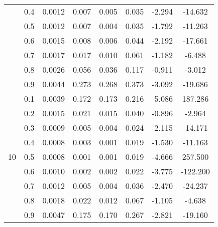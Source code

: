 \documentclass[11pt,a4paper]{report}
\begin{document}
\begin{longtable}{ | c | c || c | c | c | c | c | c | }
 & 0.4 & 0.0012 & 0.007 & 0.005 & 0.035 & -2.294 & -14.632 \\
 & 0.5 & 0.0012 & 0.007 & 0.004 & 0.035 & -1.792 & -11.263 \\
 & 0.6 & 0.0015 & 0.008 & 0.006 & 0.044 & -2.192 & -17.661 \\
 & 0.7 & 0.0017 & 0.017 & 0.010 & 0.061 & -1.182 & -6.488 \\
 & 0.8 & 0.0026 & 0.056 & 0.036 & 0.117 & -0.911 & -3.012 \\
 & 0.9 & 0.0044 & 0.273 & 0.268 & 0.373 & -3.092 & -19.686 \\
 \hline
\multirow{9}{*}{10} & 0.1 & 0.0039 & 0.172 & 0.173 & 0.216 & -5.086 & 187.286 \\
 & 0.2 & 0.0015 & 0.021 & 0.015 & 0.040 & -0.896 & -2.964 \\
 & 0.3 & 0.0009 & 0.005 & 0.004 & 0.024 & -2.115 & -14.171 \\
 & 0.4 & 0.0008 & 0.003 & 0.001 & 0.019 & -1.530 & -11.163 \\
 & 0.5 & 0.0008 & 0.001 & 0.001 & 0.019 & -4.666 & 257.500 \\
 & 0.6 & 0.0010 & 0.002 & 0.002 & 0.022 & -3.775 & -122.200 \\
 & 0.7 & 0.0012 & 0.005 & 0.004 & 0.036 & -2.470 & -24.237 \\
 & 0.8 & 0.0018 & 0.022 & 0.012 & 0.067 & -1.105 & -4.638 \\
 & 0.9 & 0.0047 & 0.175 & 0.170 & 0.267 & -2.821 & -19.160 \\
 \hline
\hline
\end{longtable}
\end{document}
